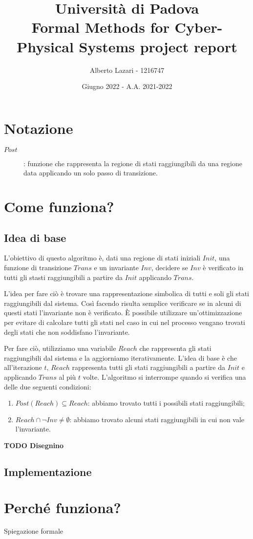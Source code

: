 \documentclass[12pt]{article}
\title{\textbf{Università di Padova \\ Formal Methods for Cyber-Physical Systems project report}}
\author{Alberto Lazari - 1216747\\}
\date{Giugno 2022 - A.A. 2021-2022}
\begin{document}
	\maketitle
	\pagebreak

	\tableofcontents
	\pagebreak

    \section{Notazione}
    \begin{description}
        \item[$Post$]: funzione che rappresenta la regione di stati raggiungibili da una regione data applicando un solo passo di transizione.
    \end{description}

	\section{Come funziona?}
	\subsection{Idea di base}
						L'obiettivo di questo algoritmo è, dati una regione di stati iniziali $Init$, una funzione di transizione $Trans$ e un invariante $Inv$, decidere se $Inv$ è verificato in tutti gli stasti raggiungibili a partire da $Init$ applicando $Trans$.

						L'idea per fare ciò è trovare una rappresentazione simbolica di tutti e soli gli stati raggiungibili dal sistema.
						Così facendo risulta semplice verificare se in alcuni di questi stati l'invariante non è verificato.
						È possibile utilizzare un'ottimizzazione per evitare di calcolare tutti gli stati nel caso in cui nel processo vengano trovati degli stati che non soddisfano l'invariante.

		Per fare ciò, utilizziamo una variabile $Reach$ che rappresenta gli stati raggiungibili dal sistema e la aggiorniamo iterativamente.
    L'idea di base è che all'iterazione $t$, $Reach$ rappresenta tutti gli stati raggiungibili a partire da $Init$ e applicando $Trans$ al più $t$ volte.
    L'algoritmo si interrompe quando si verifica una delle due seguenti condizioni:
    \begin{enumerate}
        \item $Post(Reach) \subseteq Reach $: abbiamo trovato tutti i possibili stati raggiungibili;
        \item $Reach \cap \neg Inv \neq \emptyset$: abbiamo trovato alcuni stati raggiungibili in cui non vale l'invariante.
    \end{enumerate}

	\textbf{TODO Disegnino}

	\subsection{Implementazione}
    
	\section{Perché funziona?}
	Spiegazione formale
\end{document}
